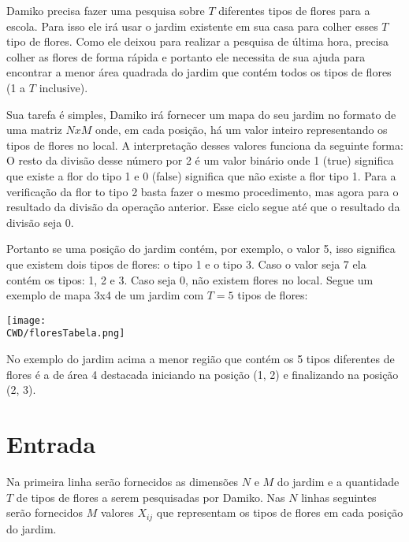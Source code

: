 

%


Damiko precisa fazer uma pesquisa sobre $T$ diferentes tipos de flores para a escola. Para isso ele irá usar o jardim existente em sua casa para colher esses $T$ tipo de flores. Como ele deixou para realizar a pesquisa de última hora, precisa colher as flores de forma rápida e portanto ele necessita de sua ajuda para encontrar a menor área quadrada do jardim que contém todos os tipos de flores (1 a $T$ inclusive).


Sua tarefa é simples, Damiko irá fornecer um mapa do seu jardim no formato de uma matriz $NxM$ onde, em cada posição, há um valor inteiro representando os tipos de flores no local. A interpretação desses valores funciona da seguinte forma: O resto da divisão desse número por 2 é um valor binário onde 1 (true) significa que existe a flor do tipo 1 e 0 (false) significa que não existe a flor tipo 1. Para a verificação da flor to tipo 2 basta fazer o mesmo procedimento, mas agora para o resultado da divisão da operação anterior. Esse ciclo segue até que o resultado da divisão seja 0.


Portanto se uma posição do jardim contém, por exemplo, o valor 5, isso significa que existem dois tipos de flores: o tipo 1 e o tipo 3. Caso o valor seja 7 ela contém os tipos:  1, 2 e 3. Caso seja 0, não existem flores no local.
Segue um exemplo de mapa 3x4 de um jardim com $T=5$ tipos de flores:




\begin{center}
  \texttt{[image: \\CWD/floresTabela.png]}
\end{center}


No exemplo do jardim acima a menor região que contém os 5 tipos diferentes de flores é a de área 4 destacada iniciando na posição (1, 2) e finalizando na posição (2, 3).

\section*{Entrada}

Na primeira linha serão fornecidos as dimensões $N$ e $M$ do jardim e a quantidade $T$ de tipos de flores a serem pesquisadas por Damiko. Nas $N$ linhas seguintes serão fornecidos $M$ valores $X_{ij}$ que representam os tipos de flores em cada posição do jardim.

